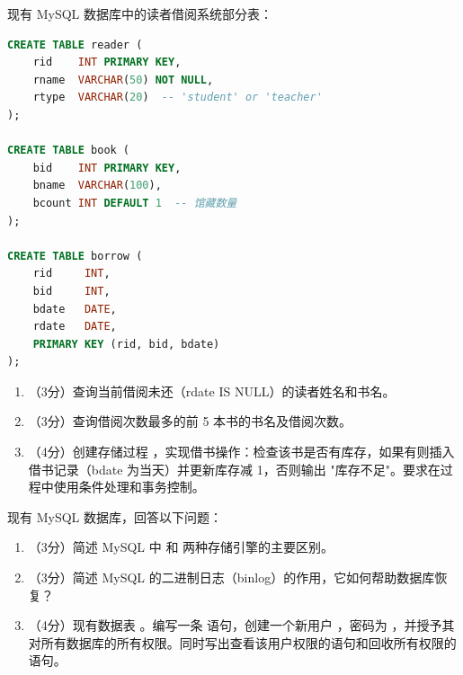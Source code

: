 \documentclass[a4paper,11pt]{article}
\begin{document}
\q 现有 MySQL 数据库中的读者借阅系统部分表：
\begin{lstlisting}[language=SQL]
CREATE TABLE reader (
    rid    INT PRIMARY KEY,
    rname  VARCHAR(50) NOT NULL,
    rtype  VARCHAR(20)  -- 'student' or 'teacher'
);

CREATE TABLE book (
    bid    INT PRIMARY KEY,
    bname  VARCHAR(100),
    bcount INT DEFAULT 1  -- 馆藏数量
);

CREATE TABLE borrow (
    rid     INT,
    bid     INT,
    bdate   DATE,
    rdate   DATE,
    PRIMARY KEY (rid, bid, bdate)
);
\end{lstlisting}
\begin{enumerate}[leftmargin=2em, itemsep=3pt]
  \item[（1）] （3分）查询当前借阅未还（rdate IS NULL）的读者姓名和书名。
  \item[（3）] （3分）查询借阅次数最多的前 5 本书的书名及借阅次数。
  \item[（3）] （4分）创建存储过程 ，实现借书操作：检查该书是否有库存，如果有则插入借书记录（bdate 为当天）并更新库存减 1，否则输出 "库存不足"。要求在过程中使用条件处理和事务控制。
\end{enumerate}
\anslines{4cm}

\q 现有 MySQL 数据库，回答以下问题：
\begin{enumerate}[leftmargin=2em, itemsep=3pt]
  \item[（1）] （3分）简述 MySQL 中  和  两种存储引擎的主要区别。
  \item[（3）] （3分）简述 MySQL 的二进制日志（binlog）的作用，它如何帮助数据库恢复？
  \item[（4）] （4分）现有数据表 。编写一条  语句，创建一个新用户 ，密码为 ，并授予其对所有数据库的所有权限。同时写出查看该用户权限的语句和回收所有权限的语句。
\end{enumerate}
\anslines{3.5cm}
\end{document}
